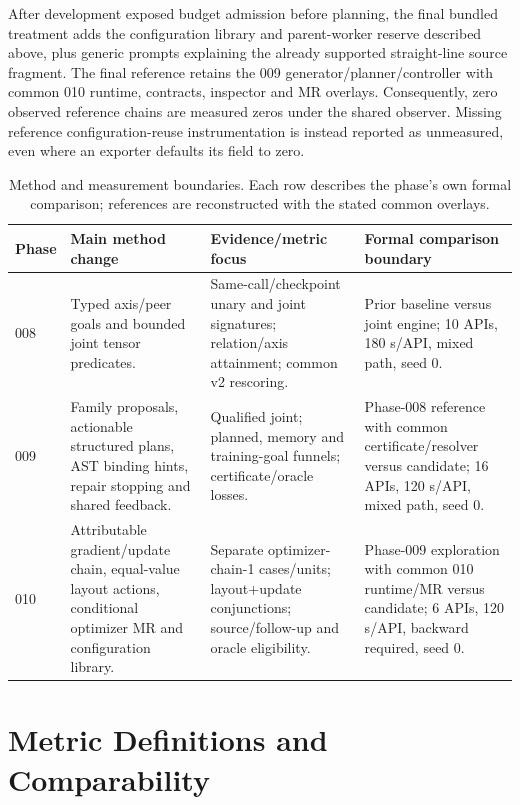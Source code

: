 \documentclass[conference]{IEEEtran}
\begin{document}
After development exposed budget admission before planning, the final bundled treatment adds the configuration library and parent-worker reserve described above, plus generic prompts explaining the already supported straight-line source fragment. The final reference retains the 009 generator/planner/controller with common 010 runtime, contracts, inspector and MR overlays. Consequently, zero observed reference chains are measured zeros under the shared observer. Missing reference configuration-reuse instrumentation is instead reported as unmeasured, even where an exporter defaults its field to zero.

\begin{table}[t]
\caption{Method and measurement boundaries. Each row describes the phase's own formal comparison; references are reconstructed with the stated common overlays.}
\label{tab:methods}
\centering\small
\begin{tabular}{p{}p{}p{}p{}}
\toprule
Phase & Main method change & Evidence/metric focus & Formal comparison boundary\\\midrule
008 & Typed axis/peer goals and bounded joint tensor predicates. & Same-call/checkpoint unary and joint signatures; relation/axis attainment; common v2 rescoring. & Prior baseline versus joint engine; 10 APIs, 180 s/API, mixed path, seed 0.\\
009 & Family proposals, actionable structured plans, AST binding hints, repair stopping and shared feedback. & Qualified joint; planned, memory and training-goal funnels; certificate/oracle losses. & Phase-008 reference with common certificate/resolver versus candidate; 16 APIs, 120 s/API, mixed path, seed 0.\\
010 & Attributable gradient/update chain, equal-value layout actions, conditional optimizer MR and configuration library. & Separate optimizer-chain-1 cases/units; layout+update conjunctions; source/follow-up and oracle eligibility. & Phase-009 exploration with common 010 runtime/MR versus candidate; 6 APIs, 120 s/API, backward required, seed 0.\\\bottomrule
\end{tabular}
\end{table}

\section{Metric Definitions and Comparability}
\end{document}
